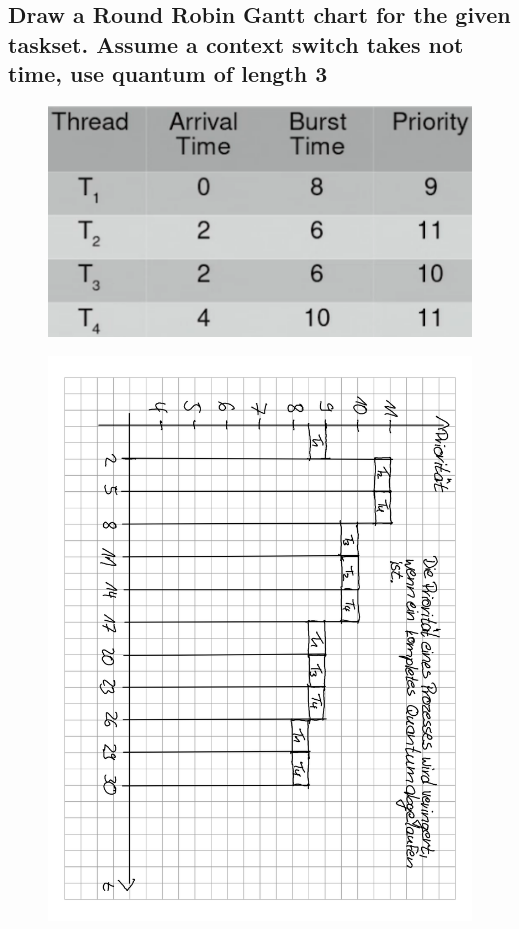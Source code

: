 \subsection{Draw a Round Robin Gantt chart for the given taskset. Assume a context switch takes not time, use quantum of length 3}
\begin{figure}[H]
	\centering
	\includegraphics[width=0.25\linewidth]{Pictures/scheduling_gantt_table_rr_prio}
\end{figure}
\begin{figure}[H]
	\centering
	\includegraphics[width=0.6\linewidth,angle=90,origin=c]{Pictures/scheduling_gantt_dia_rr_prio}
\end{figure}

